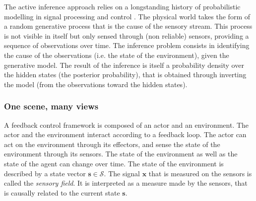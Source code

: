 \documentclass[12pt,twoside,openright]{article}
\begin{document}
{\color{Purple} The active inference approach relies on a longstanding history of probabilistic modelling in signal processing and control \citep{Kalman1960,Baum1966}. The physical world takes the form of a random generative process that is the cause of the sensory stream. This process is not visible in itself but only sensed through (non reliable) sensors, providing a sequence of observations over time. The inference problem consists in identifying the cause of the observations (i.e. the state of the environment), given the generative model. The result of the inference is itself a probability density over the hidden states (the posterior probability), that is obtained through  inverting the model (from the observations toward the hidden states).}

\subsubsection{One scene, many views}

A feedback control framework is composed of an actor and an environment. The actor and the environment interact according to a feedback loop. 
The actor can act on the environment through its effectors, and sense the state of the environment through its sensors. 
The state of the environment as well as the state of the agent can change over time. The state of the environment is described by a state vector $\boldsymbol{s} \in \mathcal{S}$.
The signal $\boldsymbol{x}$ that is measured on the sensors is called the \emph{sensory field}. It is interpreted as a measure made by the sensors, that is causally related to the current state $\boldsymbol{s}$. 
\end{document}
